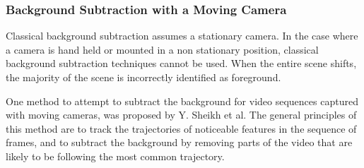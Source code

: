 \subsubsection{Background Subtraction with a Moving Camera}

Classical background subtraction assumes a stationary camera. In the case where a camera is hand held or mounted in a non stationary position, classical background subtraction techniques cannot be used. When the entire scene shifts, the majority of the scene is incorrectly identified as foreground.

One method to attempt to subtract the background for video sequences captured with moving cameras, was proposed by Y. Sheikh et al\cite{bgsubmove}. The general principles of this method are to track the trajectories of noticeable features in the sequence of frames, and to subtract the background by removing parts of the video that are likely to be following the most common trajectory.